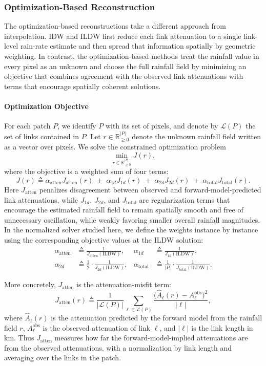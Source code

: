\documentclass[11pt]{article}
\begin{document}
\subsubsection{Optimization-Based Reconstruction}
The optimization-based reconstructions take a different approach from interpolation. IDW and ILDW first reduce each link attenuation to a single link-level rain-rate estimate and then spread that information spatially by geometric weighting. In contrast, the optimization-based methods treat the rainfall value in every pixel as an unknown and choose the full rainfall field by minimizing an objective that combines agreement with the observed link attenuations with terms that encourage spatially coherent solutions.

\paragraph*{Optimization Objective}
For each patch $P$, we identify $P$ with its set of pixels, and denote by $\mathcal{L}(P)$ the set of links contained in $P$. Let $r\in\mathbb{R}_{\ge 0}^{|P|}$ denote the unknown rainfall field written as a vector over pixels. We solve the constrained optimization problem
\[
\min_{r\in\mathbb{R}_{\ge 0}^{|P|}} J(r),
\]
where the objective is a weighted sum of four terms:
\[
J(r)\triangleq
\alpha_{\mathrm{atten}} J_{\mathrm{atten}}(r)
\;+\;
\alpha_{1d} J_{1d}(r)
\;+\;
\alpha_{2d} J_{2d}(r)
\;+\;
\alpha_{\mathrm{total}} J_{\mathrm{total}}(r).
\]
Here $J_{\mathrm{atten}}$ penalizes disagreement between observed and forward-model-predicted link attenuations, while $J_{1d}$, $J_{2d}$, and $J_{\mathrm{total}}$ are regularization terms that {\color{black}encourage the estimated rainfall field to remain spatially smooth and free of unnecessary oscillation, while weakly favoring smaller overall rainfall magnitudes.} In the normalized solver studied here, we define the weights instance by instance using the corresponding objective values at the ILDW solution:
\[
\begin{aligned}
\alpha_{\mathrm{atten}}&\triangleq\frac{1}{J_{\mathrm{atten}}({\mathrm{ILDW}})},&
\alpha_{1d}&\triangleq\frac{1}{J_{1d}({\mathrm{ILDW}})},\\
\alpha_{2d}&\triangleq\frac{1}{2} \cdot\frac{1}{J_{2d}({\mathrm{ILDW}})},&
\alpha_{\mathrm{total}}&\triangleq\frac{1}{|P|}\cdot\frac{1}{J_{\mathrm{total}}({\mathrm{ILDW}})}.
\end{aligned}
\]

More concretely, $J_{\mathrm{atten}}$ is the attenuation-misfit term:
\[
J_{\mathrm{atten}}(r)\triangleq\frac{1}{|\mathcal{L}(P)|}\sum_{\ell\in\mathcal{L}(P)}
\frac{\bigl(\widehat{A}_\ell(r)-A_\ell^{\mathrm{obs}}\bigr)^2}{|\ell|},
\]
where $\widehat{A}_\ell(r)$ is the attenuation predicted by the forward model from the rainfall field $r$, $A_\ell^{\mathrm{obs}}$ is the observed attenuation of link $\ell$, and $|\ell|$ is the link length in km. Thus $J_{\mathrm{atten}}$ measures how far the forward-model-implied attenuations are from the observed attenuations, with a normalization by link length and averaging over the links in the patch.
\end{document}
